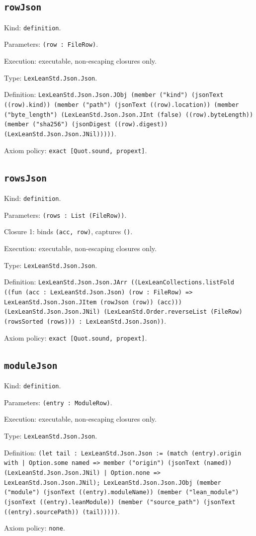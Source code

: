 \documentclass[11pt]{article}
\begin{document}
\subsection*{\texttt{rowJson}}
\noindent Kind: \texttt{definition}.\par
\noindent Parameters: \texttt{(row : FileRow)}.\par
\noindent Execution: executable, non-escaping closures only.\par
\noindent Type: \texttt{LexLeanStd.Json.Json}.\par
\noindent Definition: \texttt{LexLeanStd.Json.Json.JObj (member ("kind") (jsonText ((row).kind)) (member ("path") (jsonText ((row).location)) (member ("byte\_length") (LexLeanStd.Json.Json.JInt (false) ((row).byteLength)) (member ("sha256") (jsonDigest ((row).digest)) (LexLeanStd.Json.Json.JNil)))))}.\par
\noindent Axiom policy: \texttt{exact [Quot.sound, propext]}.\par
\subsection*{\texttt{rowsJson}}
\noindent Kind: \texttt{definition}.\par
\noindent Parameters: \texttt{(rows : List (FileRow))}.\par
\noindent Closure 1: binds \texttt{(acc, row)}, captures \texttt{()}.\par
\noindent Execution: executable, non-escaping closures only.\par
\noindent Type: \texttt{LexLeanStd.Json.Json}.\par
\noindent Definition: \texttt{LexLeanStd.Json.Json.JArr ((LexLeanCollections.listFold ((fun (acc : LexLeanStd.Json.Json) (row : FileRow) => LexLeanStd.Json.Json.JItem (rowJson (row)) (acc))) (LexLeanStd.Json.Json.JNil) (LexLeanStd.Order.reverseList (FileRow) (rowsSorted (rows))) : LexLeanStd.Json.Json))}.\par
\noindent Axiom policy: \texttt{exact [Quot.sound, propext]}.\par
\subsection*{\texttt{moduleJson}}
\noindent Kind: \texttt{definition}.\par
\noindent Parameters: \texttt{(entry : ModuleRow)}.\par
\noindent Execution: executable, non-escaping closures only.\par
\noindent Type: \texttt{LexLeanStd.Json.Json}.\par
\noindent Definition: \texttt{(let tail : LexLeanStd.Json.Json := (match (entry).origin with | Option.some named => member ("origin") (jsonText (named)) (LexLeanStd.Json.Json.JNil) | Option.none => LexLeanStd.Json.Json.JNil); LexLeanStd.Json.Json.JObj (member ("module") (jsonText ((entry).moduleName)) (member ("lean\_module") (jsonText ((entry).leanModule)) (member ("source\_path") (jsonText ((entry).sourcePath)) (tail)))))}.\par
\noindent Axiom policy: \texttt{none}.\par
\end{document}
